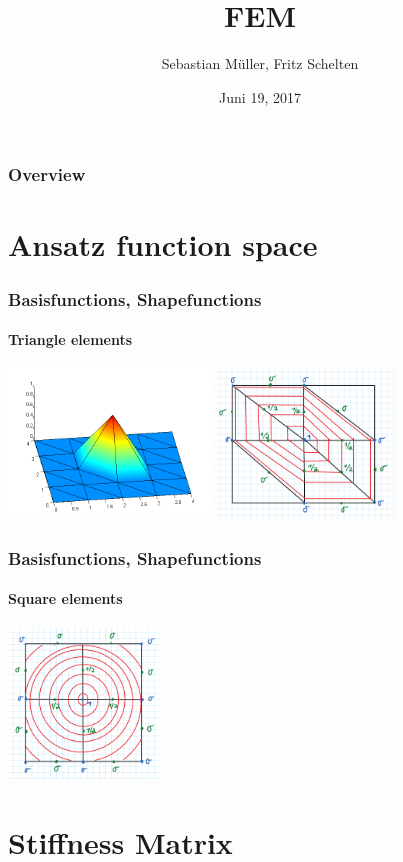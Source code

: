 \documentclass[mathserif]{beamer}
\title{FEM}
\author{Sebastian Müller, Fritz Schelten}
\date{Juni 19, 2017}
\begin{document}
\begin{frame}
\titlepage
\end{frame}

\begin{frame}
\frametitle{Overview}
\tableofcontents
\end{frame}

\section{Ansatz function space}

\begin{frame}
	\frametitle{Basisfunctions, Shapefunctions}
	\framesubtitle{Triangle elements}
	\includegraphics[height=4cm]{triangleplot.png}
	\includegraphics[height=4cm]{triangles.PNG}
\end{frame}

\begin{frame}
	\frametitle{Basisfunctions, Shapefunctions}
	\framesubtitle{Square elements}
	\includegraphics[height=4cm]{squares.PNG}
\end{frame}

\section{Stiffness Matrix}
\end{document}
